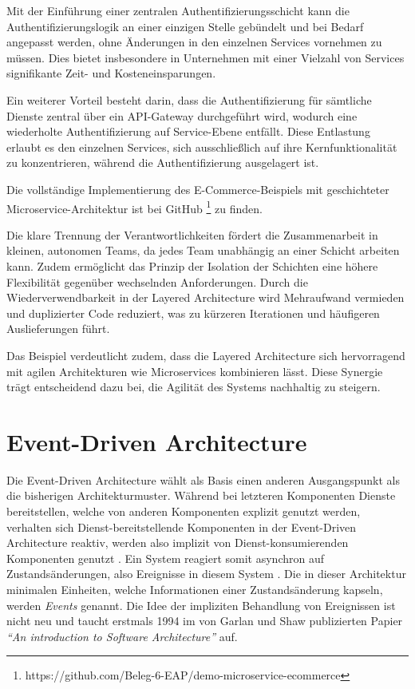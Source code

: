 \documentclass[acmtog]{acmart}
\begin{document}
Mit der Einführung einer zentralen Authentifizierungsschicht kann die Authentifizierungslogik
an einer einzigen Stelle gebündelt und bei Bedarf angepasst werden, ohne Änderungen in den
einzelnen Services vornehmen zu müssen.
Dies bietet insbesondere in Unternehmen mit einer Vielzahl von Services signifikante Zeit- und Kosteneinsparungen.

Ein weiterer Vorteil besteht darin, dass die Authentifizierung für sämtliche Dienste
zentral über ein API-Gateway durchgeführt wird, wodurch eine wiederholte Authentifizierung
auf Service-Ebene entfällt.
Diese Entlastung erlaubt es den einzelnen Services, sich ausschließlich auf ihre
Kernfunktionalität zu konzentrieren, während die Authentifizierung ausgelagert ist.

Die vollständige Implementierung des E-Commerce-Beispiels mit geschichteter Microservice-Architektur
ist bei GitHub \footnote{https://github.com/Beleg-6-EAP/demo-microservice-ecommerce} zu finden.

Die klare Trennung der Verantwortlichkeiten fördert die Zusammenarbeit in kleinen, autonomen
Teams, da jedes Team unabhängig an einer Schicht arbeiten kann.
Zudem ermöglicht das Prinzip der Isolation der Schichten eine höhere Flexibilität gegenüber wechselnden Anforderungen.
Durch die Wiederverwendbarkeit in der Layered Architecture wird Mehraufwand vermieden und duplizierter
Code reduziert, was zu kürzeren Iterationen und häufigeren Auslieferungen führt.

Das Beispiel verdeutlicht zudem, dass die Layered Architecture sich hervorragend mit agilen
Architekturen wie Microservices kombinieren lässt.
Diese Synergie trägt entscheidend dazu bei, die Agilität des Systems nachhaltig zu steigern.

\section{Event-Driven Architecture}
\label{sec:eda}
Die Event-Driven Architecture wählt als Basis einen anderen Ausgangspunkt als die bisherigen Architekturmuster.
Während bei letzteren Komponenten Dienste bereitstellen, welche von anderen Komponenten explizit genutzt werden,
verhalten sich Dienst-bereitstellende Komponenten in der Event-Driven Architecture reaktiv,
werden also implizit von Dienst-konsumierenden Komponenten genutzt \cite{garlanShawImplizit}.
Ein System reagiert somit asynchron auf Zustandsänderungen, also Ereignisse in diesem System \cite{eda}.
Die in dieser Architektur minimalen Einheiten, welche Informationen einer Zustandsänderung kapseln, werden \textit{Events} genannt.
Die Idee der impliziten Behandlung von Ereignissen ist nicht neu und taucht erstmals 1994 im von Garlan und Shaw publizierten Papier
\textit{\enquote{An introduction to Software Architecture}} auf.
\end{document}
